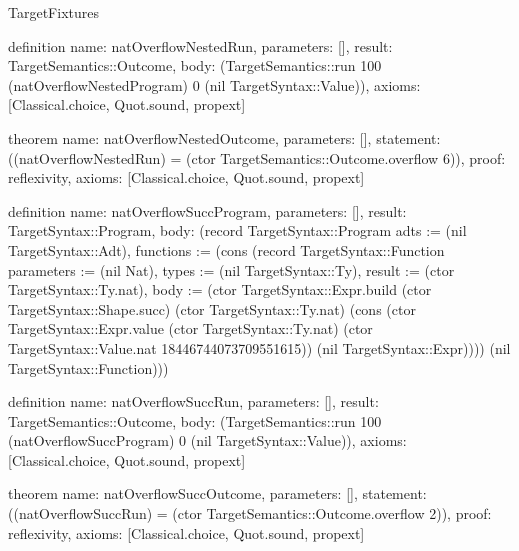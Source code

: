 \begin{lexlean}{TargetFixtures}
\begin{semanticmodule}
definition{
  name: natOverflowNestedRun,
  parameters: [],
  result: TargetSemantics::Outcome,
  body: (TargetSemantics::run 100 (natOverflowNestedProgram) 0 (nil TargetSyntax::Value)),
  axioms: [Classical.choice, Quot.sound, propext]
}

theorem{
  name: natOverflowNestedOutcome,
  parameters: [],
  statement: ((natOverflowNestedRun) = (ctor TargetSemantics::Outcome.overflow 6)),
  proof: reflexivity{},
  axioms: [Classical.choice, Quot.sound, propext]
}

definition{
  name: natOverflowSuccProgram,
  parameters: [],
  result: TargetSyntax::Program,
  body: (record TargetSyntax::Program {adts := (nil TargetSyntax::Adt), functions := (cons (record TargetSyntax::Function {parameters := (nil Nat), types := (nil TargetSyntax::Ty), result := (ctor TargetSyntax::Ty.nat), body := (ctor TargetSyntax::Expr.build (ctor TargetSyntax::Shape.succ) (ctor TargetSyntax::Ty.nat) (cons (ctor TargetSyntax::Expr.value (ctor TargetSyntax::Ty.nat) (ctor TargetSyntax::Value.nat 18446744073709551615)) (nil TargetSyntax::Expr)))}) (nil TargetSyntax::Function))})
}

definition{
  name: natOverflowSuccRun,
  parameters: [],
  result: TargetSemantics::Outcome,
  body: (TargetSemantics::run 100 (natOverflowSuccProgram) 0 (nil TargetSyntax::Value)),
  axioms: [Classical.choice, Quot.sound, propext]
}

theorem{
  name: natOverflowSuccOutcome,
  parameters: [],
  statement: ((natOverflowSuccRun) = (ctor TargetSemantics::Outcome.overflow 2)),
  proof: reflexivity{},
  axioms: [Classical.choice, Quot.sound, propext]
}


\end{semanticmodule}
\end{lexlean}
